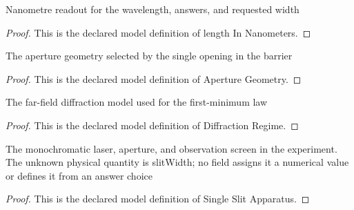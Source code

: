 \begin{definition}
  \label{def:physics:phyx-mini-0047:phyxminiproblems-problemphyxmini0047-lengthinnanometers}
  Nanometre readout for the wavelength, answers, and requested width
\end{definition}
\begin{proof}
  This is the declared model definition of length In Nanometers.
\end{proof}
\begin{definition}
  \label{def:physics:phyx-mini-0047:phyxminiproblems-problemphyxmini0047-aperturegeometry}
  The aperture geometry selected by the single opening in the barrier
\end{definition}
\begin{proof}
  This is the declared model definition of Aperture Geometry.
\end{proof}
\begin{definition}
  \label{def:physics:phyx-mini-0047:phyxminiproblems-problemphyxmini0047-diffractionregime}
  The far-field diffraction model used for the first-minimum law
\end{definition}
\begin{proof}
  This is the declared model definition of Diffraction Regime.
\end{proof}
\begin{definition}
  \label{def:physics:phyx-mini-0047:phyxminiproblems-problemphyxmini0047-singleslitapparatus}
  The monochromatic laser, aperture, and observation screen in the experiment. The unknown physical quantity is slitWidth; no field assigns it a numerical value or defines it from an answer choice
\end{definition}
\begin{proof}
  This is the declared model definition of Single Slit Apparatus.
\end{proof}
